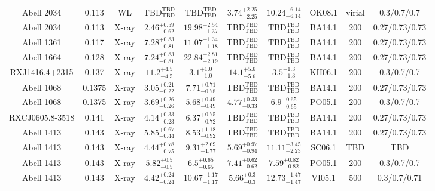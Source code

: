 \begin{table}
\begin{tabular}{cccccccccc}
Abell 2034 & 0.113 & WL & ${\mathrm{TBD}}^{\mathrm{TBD}}_{\mathrm{TBD}}$ & ${\mathrm{TBD}}^{\mathrm{TBD}}_{\mathrm{TBD}}$ & ${3.74}^{+2.25}_{-2.25}$ & ${10.24}^{+6.14}_{-6.14}$ & OK08.1 & virial & 0.3/0.7/0.7 \\
Abell 2034 & 0.113 & X-ray & ${2.46}^{+0.59}_{-0.62}$ & ${19.98}^{+2.54}_{-1.37}$ & ${\mathrm{TBD}}^{\mathrm{TBD}}_{\mathrm{TBD}}$ & ${\mathrm{TBD}}^{\mathrm{TBD}}_{\mathrm{TBD}}$ & BA14.1 & 200 & 0.27/0.73/0.73 \\
Abell 1361 & 0.117 & X-ray & ${7.28}^{+0.83}_{-0.81}$ & ${11.07}^{+1.34}_{-1.18}$ & ${\mathrm{TBD}}^{\mathrm{TBD}}_{\mathrm{TBD}}$ & ${\mathrm{TBD}}^{\mathrm{TBD}}_{\mathrm{TBD}}$ & BA14.1 & 200 & 0.27/0.73/0.73 \\
Abell 1664 & 0.128 & X-ray & ${7.24}^{+0.83}_{-0.81}$ & ${22.84}^{+2.81}_{-2.19}$ & ${\mathrm{TBD}}^{\mathrm{TBD}}_{\mathrm{TBD}}$ & ${\mathrm{TBD}}^{\mathrm{TBD}}_{\mathrm{TBD}}$ & BA14.1 & 200 & 0.27/0.73/0.73 \\
RXJ1416.4+2315 & 0.137 & X-ray & ${11.2}^{+4.5}_{-4.5}$ & ${3.1}^{+1.0}_{-1.0}$ & ${14.1}^{+5.6}_{-5.6}$ & ${3.5}^{+1.3}_{-1.3}$ & KH06.1 & 200 & 0.3/0.7/0.7 \\
Abell 1068 & 0.1375 & X-ray & ${3.05}^{+0.21}_{-0.22}$ & ${7.71}^{+0.71}_{-0.78}$ & ${\mathrm{TBD}}^{\mathrm{TBD}}_{\mathrm{TBD}}$ & ${\mathrm{TBD}}^{\mathrm{TBD}}_{\mathrm{TBD}}$ & BA14.1 & 200 & 0.27/0.73/0.73 \\
Abell 1068 & 0.1375 & X-ray & ${3.69}^{+0.26}_{-0.26}$ & ${5.68}^{+0.49}_{-0.49}$ & ${4.77}^{+0.33}_{-0.33}$ & ${6.9}^{+0.65}_{-0.65}$ & PO05.1 & 200 & 0.3/0.7/0.7 \\
RXCJ0605.8-3518 & 0.141 & X-ray & ${4.14}^{+0.33}_{-0.23}$ & ${6.37}^{+0.75}_{-0.72}$ & ${\mathrm{TBD}}^{\mathrm{TBD}}_{\mathrm{TBD}}$ & ${\mathrm{TBD}}^{\mathrm{TBD}}_{\mathrm{TBD}}$ & BA14.1 & 200 & 0.27/0.73/0.73 \\
Abell 1413 & 0.143 & X-ray & ${5.85}^{+0.67}_{-0.44}$ & ${8.53}^{+1.18}_{-0.92}$ & ${\mathrm{TBD}}^{\mathrm{TBD}}_{\mathrm{TBD}}$ & ${\mathrm{TBD}}^{\mathrm{TBD}}_{\mathrm{TBD}}$ & BA14.1 & 200 & 0.27/0.73/0.73 \\
Abell 1413 & 0.143 & X-ray & ${4.44}^{+0.78}_{-0.75}$ & ${9.31}^{+2.69}_{-1.77}$ & ${5.69}^{+0.97}_{-0.94}$ & ${11.11}^{+3.45}_{-2.23}$ & SC06.1 & TBD & TBD \\
Abell 1413 & 0.143 & X-ray & ${5.82}^{+0.5}_{-0.5}$ & ${6.5}^{+0.65}_{-0.65}$ & ${7.41}^{+0.62}_{-0.62}$ & ${7.59}^{+0.82}_{-0.82}$ & PO05.1 & 200 & 0.3/0.7/0.7 \\
Abell 1413 & 0.143 & X-ray & ${4.42}^{+0.24}_{-0.24}$ & ${10.67}^{+1.17}_{-1.17}$ & ${5.66}^{+0.3}_{-0.3}$ & ${12.73}^{+1.47}_{-1.47}$ & VI05.1 & 500 & 0.3/0.7/0.71 \\

\end{tabular}
\end{table}
